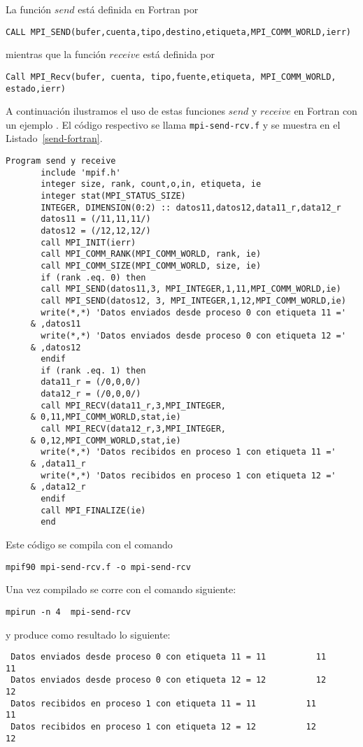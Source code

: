 \documentclass[letter]{jpconf}
\begin{document}
La funci\'on $send$ est\'a definida en Fortran por
\color{black}
\begin{verbatim}
CALL MPI_SEND(bufer,cuenta,tipo,destino,etiqueta,MPI_COMM_WORLD,ierr)
\end{verbatim}
\color{black}

mientras que la funci\'on $receive$ est\'a definida por
\color{black}
\begin{verbatim}
Call MPI_Recv(bufer, cuenta, tipo,fuente,etiqueta, MPI_COMM_WORLD, estado,ierr)
\end{verbatim}
\color{black}


A continuaci\'on ilustramos el uso de estas funciones $send$ y $receive$ en Fortran con un ejemplo . El c\'odigo respectivo se llama  \texttt{mpi-send-rcv.f} y se muestra en el Listado~\ref{send-fortran}.
\begin{lstlisting}[float,floatplacement=H,label=send-fortran,caption=Listado del programa \texttt{mpi-send-rcv.f} en Fortran]
       Program send y receive
       include 'mpif.h'
       integer size, rank, count,o,in, etiqueta, ie
       integer stat(MPI_STATUS_SIZE)   
       INTEGER, DIMENSION(0:2) :: datos11,datos12,data11_r,data12_r
       datos11 = (/11,11,11/)
       datos12 = (/12,12,12/)
       call MPI_INIT(ierr)
       call MPI_COMM_RANK(MPI_COMM_WORLD, rank, ie)
       call MPI_COMM_SIZE(MPI_COMM_WORLD, size, ie)
       if (rank .eq. 0) then
       call MPI_SEND(datos11,3, MPI_INTEGER,1,11,MPI_COMM_WORLD,ie)
       call MPI_SEND(datos12, 3, MPI_INTEGER,1,12,MPI_COMM_WORLD,ie)
       write(*,*) 'Datos enviados desde proceso 0 con etiqueta 11 ='
     & ,datos11
       write(*,*) 'Datos enviados desde proceso 0 con etiqueta 12 ='
     & ,datos12
       endif
       if (rank .eq. 1) then
       data11_r = (/0,0,0/)
       data12_r = (/0,0,0/)
       call MPI_RECV(data11_r,3,MPI_INTEGER,
     & 0,11,MPI_COMM_WORLD,stat,ie)
       call MPI_RECV(data12_r,3,MPI_INTEGER,
     & 0,12,MPI_COMM_WORLD,stat,ie)
       write(*,*) 'Datos recibidos en proceso 1 con etiqueta 11 ='
     & ,data11_r
       write(*,*) 'Datos recibidos en proceso 1 con etiqueta 12 ='
     & ,data12_r
       endif
       call MPI_FINALIZE(ie)
       end
\end{lstlisting}


Este c\'odigo se compila con el comando
\color{blue}
\begin{verbatim}
mpif90 mpi-send-rcv.f -o mpi-send-rcv
\end{verbatim}
\color{black}

Una vez compilado se corre con el comando siguiente:
\color{blue}
\begin{verbatim}
mpirun -n 4  mpi-send-rcv
\end{verbatim}
\color{black}
y produce como resultado lo siguiente:
\color{brown}
\begin{verbatim}
 Datos enviados desde proceso 0 con etiqueta 11 = 11          11          11
 Datos enviados desde proceso 0 con etiqueta 12 = 12          12          12
 Datos recibidos en proceso 1 con etiqueta 11 = 11          11          11
 Datos recibidos en proceso 1 con etiqueta 12 = 12          12          12
\end{verbatim}
\color{black}
\end{document}
